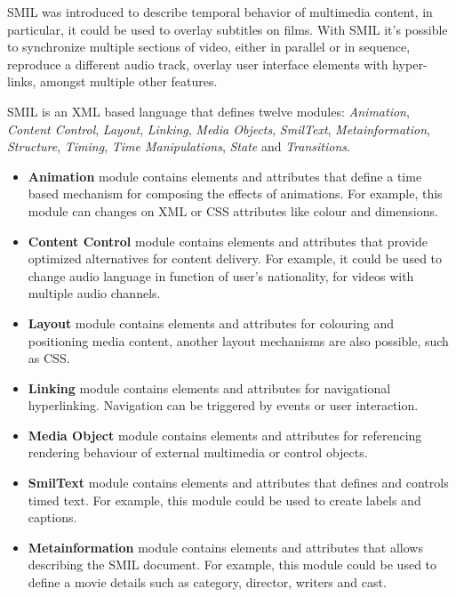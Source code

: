   \ac{SMIL}\cite{smil} was introduced to describe temporal behavior of multimedia content, in particular, it could be used to overlay subtitles on films. With \ac{SMIL} it's possible to synchronize multiple sections of video, either in parallel or in sequence, reproduce a different audio track, overlay user interface elements with hyper-links, amongst multiple other features.

  \ac{SMIL} is an \ac{XML} based language that defines twelve modules: \textit{Animation}, \textit{Content Control}, \textit{Layout}, \textit{Linking}, \textit{Media Objects}, \textit{SmilText}, \textit{Metainformation}, \textit{Structure}, \textit{Timing}, \textit{Time Manipulations}, \textit{State} and \textit{Transitions}.


\begin{itemize}

  \item \textbf{Animation} module contains elements and attributes that define a time based mechanism for composing the effects of animations. For example, this module can changes on \ac{XML} or \ac{CSS} attributes like colour and dimensions.  

  \item \textbf{Content Control} module contains elements and attributes that provide optimized alternatives for content delivery. For example, it could be used to change audio language in function of user's nationality, for videos with multiple audio channels.

  \item \textbf{Layout} module contains elements and attributes for colouring and positioning media content, another layout mechanisms are also possible, such as \ac{CSS}.

  \item \textbf{Linking} module contains elements and attributes for navigational hyperlinking. Navigation can be triggered by events or user interaction.

  \item \textbf{Media Object} module contains elements and attributes for referencing rendering behaviour of external multimedia or control objects.

  \item \textbf{SmilText} module contains elements and attributes that defines and controls timed text. For example, this module could be used to create labels and captions.


  \item \textbf{Metainformation} module contains elements and attributes that allows describing the \ac{SMIL} document. For example, this module could be used to define a movie details such as category, director, writers and cast.


\end{itemize}
